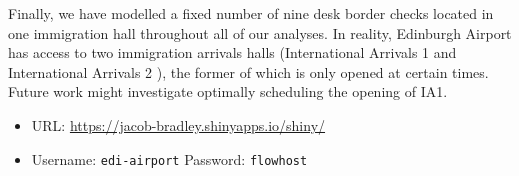 \documentclass[10pt]{article}
\begin{document}
Finally, we have modelled a fixed number of nine desk border checks located in one immigration hall throughout all of our analyses. In reality, Edinburgh Airport has access to two immigration arrivals halls (International Arrivals 1 and International Arrivals 2 \cite{international_arrivals}), the former of which is only opened at certain times. Future work might investigate optimally scheduling the opening of IA1. 



\begin{tcolorbox}[
colframe=edi-dark-purple,
colback=edi-light-purple,
fonttitle=\bfseries,
title = {Use our Shiny Application to interactively explore demand scenarios!}]
\begin{itemize}
\item URL: \url{https://jacob-bradley.shinyapps.io/shiny/}
\item Username: \texttt{edi-airport} \quad Password: \texttt{flowhost}
\end{itemize}


\end{tcolorbox}

{\footnotesize
}
% 
\end{document}
